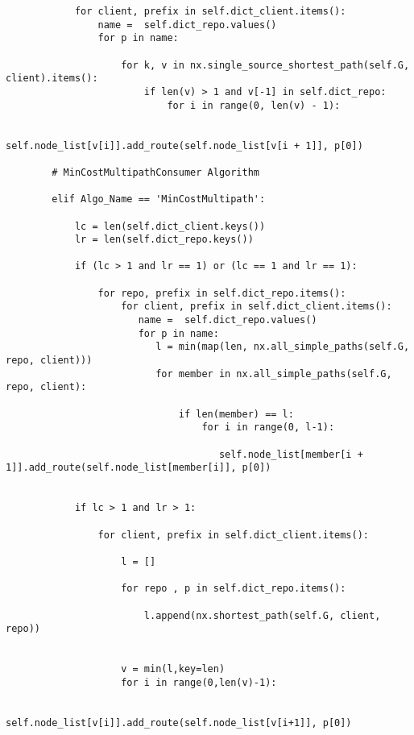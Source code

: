\begin{lstlisting}
            for client, prefix in self.dict_client.items():
                name =  self.dict_repo.values()
                for p in name:

                    for k, v in nx.single_source_shortest_path(self.G, client).items():
                        if len(v) > 1 and v[-1] in self.dict_repo:
                            for i in range(0, len(v) - 1): 
     
                                self.node_list[v[i]].add_route(self.node_list[v[i + 1]], p[0])

        # MinCostMultipathConsumer Algorithm

        elif Algo_Name == 'MinCostMultipath':

            lc = len(self.dict_client.keys())
            lr = len(self.dict_repo.keys())

            if (lc > 1 and lr == 1) or (lc == 1 and lr == 1):

                for repo, prefix in self.dict_repo.items():
                    for client, prefix in self.dict_client.items():
                       name =  self.dict_repo.values()
                       for p in name:
                          l = min(map(len, nx.all_simple_paths(self.G, repo, client)))
                          for member in nx.all_simple_paths(self.G, repo, client):
                     
                              if len(member) == l:    
                                  for i in range(0, l-1): 

                                     self.node_list[member[i + 1]].add_route(self.node_list[member[i]], p[0])                               
    

            if lc > 1 and lr > 1:
                                                                                         
                for client, prefix in self.dict_client.items():

                    l = []

                    for repo , p in self.dict_repo.items():       
           
                        l.append(nx.shortest_path(self.G, client, repo))


                    v = min(l,key=len)
                    for i in range(0,len(v)-1):

                         self.node_list[v[i]].add_route(self.node_list[v[i+1]], p[0])   
                                                                       


\end{lstlisting}
